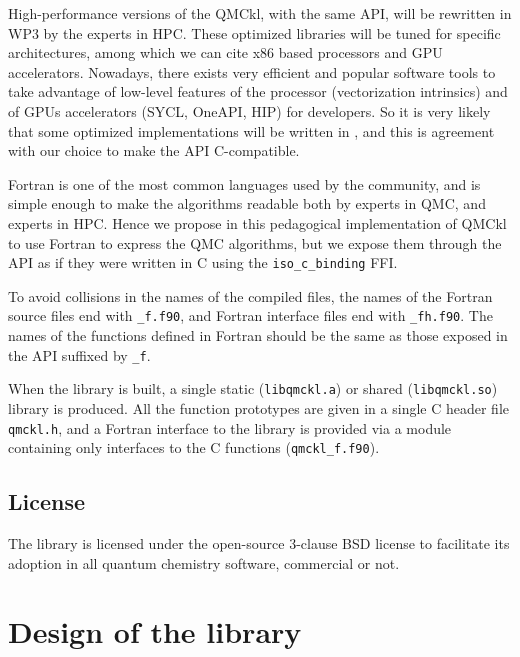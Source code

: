 High-performance versions of the \ac{QMCkl}, with the same \ac{API},
will be rewritten in \ac{WP}3 by the experts in \ac{HPC}. These
optimized libraries will be tuned for specific architectures, among
which we can cite x86 based processors and \ac{GPU} accelerators.
Nowadays, there exists very efficient and popular software tools to
take advantage of low-level features of the processor\cite{pohl_2016}
(vectorization intrinsics) and of \acp{GPU} accelerators (SYCL\cite{SYCL},
OneAPI, HIP) for {\CC} developers. So it is very likely
that some optimized implementations will be written in {\CC}, and this
is agreement with our choice to make the \ac{API} C-compatible.

Fortran is one of the most common languages used by the community, and
is simple enough to make the algorithms readable both by experts in
\ac{QMC}, and experts in \ac{HPC}. Hence we propose in this
pedagogical implementation of \ac{QMCkl} to use Fortran to express the
QMC algorithms, but we expose them through the \ac{API} as if they
were written in C using the \texttt{iso_c_binding} \ac{FFI}.

To avoid collisions in the names of the compiled files, the names of
the Fortran source files end with \texttt{_f.f90}, and Fortran
interface files end with \texttt{_fh.f90}.
The names of the functions defined in Fortran should be the
same as those exposed in the \ac{API} suffixed by \texttt{_f}.

When the library is built, a single static
(\texttt{libqmckl.a}) or shared
(\texttt{libqmckl.so}) library is produced. All the
function prototypes are given in a single C header file
\texttt{qmckl.h}, and a Fortran interface to the library is
provided via a module containing only interfaces to the C functions
(\texttt{qmckl_f.f90}).

\subsection{License}

The library is licensed under the open-source 3-clause BSD license to facilitate
its adoption in all quantum chemistry software, commercial or not.


\section{Design of the library}

